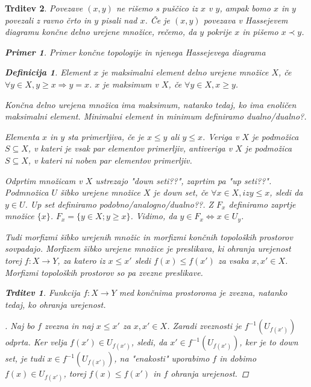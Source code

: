 \documentclass[a4paper,12pt]{article}
\theoremstyle{definition}
\newtheorem{definicija}{Definicija}
\theoremstyle{plain}
\theoremstyle{definition}
\newtheorem{primer}{Primer}
\theoremstyle{plain}
\newtheorem{trditev}{Trditev}
\theoremstyle{plain}
\theoremstyle{plain}
\theoremstyle{plain}
\newenvironment{dokaz}{\begin{proof}[\bfseries\upshape\proofname]}{\end{proof}}
\begin{document}
\begin{trditev}
Povezave $(x,y)$ ne rišemo s puščico iz $x$ v $y$, ampak bomo $x$ in $y$ povezali z ravno črto in $y$ pisali nad $x$. Če je $(x,y)$ povezava v Hassejevem diagramu končne delno urejene množice, rečemo, da $y$ \textit{pokrije} $x$ in pišemo $x\prec y$.

\begin{primer}
    Primer končne topologije in njenega Hassejevega diagrama
\end{primer}

\begin{definicija}
    Element $x$ je \textit{maksimalni element} delno urejene množice $X$, če $\forall y \in X, y\geq x \Rightarrow y = x$.
    $x$ je \textit{maksimum} v $X$, če $\forall y \in X, x\geq y$.
\end{definicija}

Končna delno urejena množica ima maksimum, natanko tedaj, ko ima enoličen maksimalni element. \textit{Minimalni element} in \textit{minimum} definiramo dualno/dualno?.

Elementa $x$ in $y$ sta \textit{primerljiva}, če je $x\leq y$ ali $y\leq x$. \textit{Veriga} v $X$ je podmožica $S\subseteq X$, v kateri je vsak par elementov primerljiv, \textit{antiveriga} v $X$ je podmožica $S\subseteq X$, v kateri ni noben par elementov primerljiv. 

Odprtim množicam v $X$ ustrezajo \textit{"down seti??"}, zaprtim pa \textit{"up seti??"}. Podmnožica $U$
 šibko urejene množice $X$ je down set, če $\forall x\in X, iz y\leq x$, sledi da $y\in U$. Up set definiramo podobno/analogno/dualno??.
Z $F_x$ definiramo zaprtje množice $\{x\}$. $F_x=\{y\in X; y\geq x\}$. Vidimo, da $y\in F_x \Leftrightarrow x\in U_y$.

Tudi morfizmi šibko urejenih množic in morfizmi končnih topoloških prostorov sovpadajo.
  Morfizem šibko urejene množice je preslikava, ki ohranja urejenost torej $f: X\rightarrow Y$, 
  za katero iz $x\leq x'$ sledi $f(x)\leq f(x')$ za vsaka $x,x'\in X$. Morfizmi topoloških prostorov so pa zvezne preslikave.

\begin{trditev}
Funkcija $f:X\rightarrow Y$ med končnima prostoroma je zvezna, natanko tedaj, ko ohranja urejenost.
\end{trditev}

\begin{dokaz}
    Naj bo $f$ zvezna in naj $x\leq x'$ za $x, x' \in X$. Zaradi zveznosti je $f^{-1}(U_{f(x')})$ odprta. Ker velja $f(x')\in U_{f(x')}$, sledi, da $x'\in f^{-1}(U_{f(x')})$, ker je to down set, je tudi $x\in f^{-1}(U_{f(x')})$, na "enakosti" uporabimo $f$ in dobimo $f(x)\in U_{f(x')}$, torej $f(x)\leq f(x')$ in $f$ ohranja urejenost.


\end{dokaz}
\end{trditev}
\end{document}
